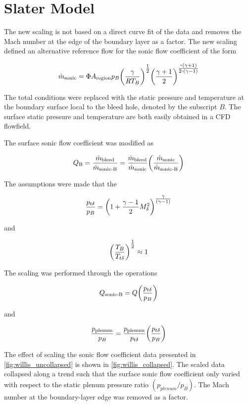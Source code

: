 \section{Slater Model}

The new scaling is not based on a direct curve fit of the data and removes the Mach number at the edge of the boundary layer as a factor. The new scaling defined an alternative reference flow for the sonic flow coefficient of the form

\begin{equation} \dot{m}_{\textrm{sonic}} = \Phi A_{\textrm{region}} p_B \qty(\frac{\gamma}{RT_B})^{\textstyle\frac{1}{2}} \qty(\frac{\gamma+1}{2})^{\textstyle\frac{\texttt{-}\qty(\gamma+1)}{2\cdot\qty(\gamma-1)}} 
	\label{eq:mdot_sonic_slater} \end{equation}

The total conditions were replaced with the static pressure and temperature at the boundary surface local to the bleed hole, denoted by the subscript $B$. The surface static pressure and temperature are both easily obtained in a CFD flowfield. 

The surface sonic flow coefficient was modified as

$$ Q_{\textrm{B}} = \frac{\dot{m}_{\textrm{bleed}}}{\dot{m}_{\textrm{sonic-B}}} = \frac{\dot{m}_{\textrm{bleed}}}{\dot{m}_{\textrm{sonic}}} \qty(\frac{\dot{m}_{\textrm{sonic}}}{\dot{m}_{\textrm{sonic-B}}}) $$

The assumptions were made that the 

$$ \frac{p_{t\delta}}{p_B} = \qty(1+\frac{\gamma-1}{2}M_\delta^2)^{\textstyle\frac{\gamma}{\qty(\gamma-1)}} $$

and 

$$ \qty(\frac{T_B}{T_{t\delta}})^{\textstyle\frac{1}{2}} \approx 1 $$

The scaling was performed through the operations

$$ Q_{\textrm{sonic-B}} = Q\qty(\frac{p_{t\delta}}{p_B}) $$

and

\begin{equation} \frac{p_{\textrm{plenum}}}{p_B} = \frac{p_{\textrm{plenum}}}{p_{t\delta}}\qty(\frac{p_{t\delta}}{p_B})
	\label{eq:b_static_plenum_pratio} \end{equation}

The effect of scaling the sonic flow coefficient data presented in \cref{fig:willis_uncollapsed} is shown in \cref{fig:willis_collapsed}. The scaled data collapsed along a trend such that the surface sonic flow coefficient only varied with respect to the static plenum pressure ratio $(p_{plenum}/p_B)$. The Mach number at the boundary-layer edge was removed as a factor.

